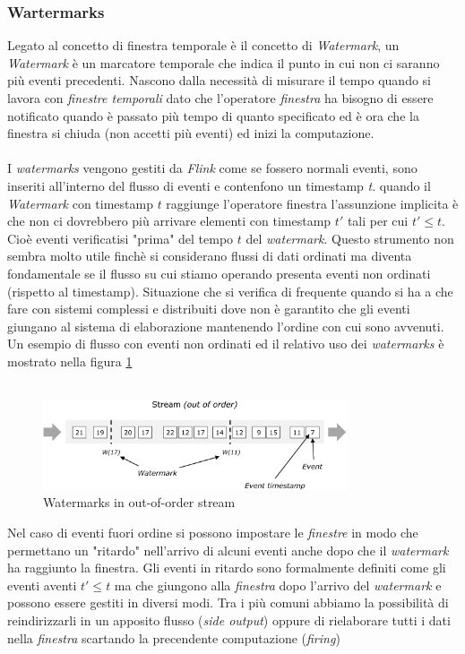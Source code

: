 \subsubsection{Wartermarks}
\label{subsubsec:flink_watermarks}
Legato al concetto di finestra temporale è il concetto di \textit{Watermark}, un \textit{Watermark} è un marcatore temporale che indica il punto in cui non ci saranno più eventi precedenti.
Nascono dalla necessità di misurare il tempo quando si lavora con \textit{finestre temporali} dato che l'operatore \textit{finestra} ha bisogno di essere notificato
quando è passato più tempo di quanto specificato ed è ora che la finestra si chiuda (non accetti più eventi) ed inizi la computazione.\\\\
I \textit{watermarks} vengono gestiti da \textit{Flink} come se fossero normali eventi, sono inseriti all'interno del flusso di eventi e contenfono un timestamp \textit{t}.
quando il \textit{Watermark} con timestamp $t$ raggiunge l'operatore finestra l'assunzione implicita è che non ci dovrebbero più arrivare elementi con timestamp $t'$ tali per cui $t' \leq t$.
Cioè eventi verificatisi "prima" del tempo $t$ del \textit{watermark}.
Questo strumento non sembra molto utile finchè si considerano flussi di dati ordinati ma diventa fondamentale se il flusso su cui stiamo operando presenta eventi
non ordinati (rispetto al timestamp).
Situazione che si verifica di frequente quando si ha a che fare con sistemi complessi e distribuiti dove non è garantito che gli eventi 
giungano al sistema di elaborazione mantenendo l'ordine con cui sono avvenuti.
Un esempio di flusso con eventi non ordinati ed il relativo uso dei \textit{watermarks} è mostrato nella figura \ref{fig:watermark}\\\\
\begin{figure}[htbp]
    \centering
    \includegraphics[width=0.8\textwidth]{images/flink/watermark_out_of_order.png}
    \caption{Watermarks in out-of-order stream}
    \label{fig:watermark}
\end{figure}
Nel caso di eventi fuori ordine si possono impostare le \textit{finestre} in modo che permettano un "ritardo" nell'arrivo di alcuni eventi anche dopo che il \textit{watermark} ha raggiunto la finestra.
Gli eventi in ritardo sono formalmente definiti come gli eventi aventi $t' \leq t$ ma che giungono alla \textit{finestra} dopo l'arrivo del \textit{watermark} e possono essere gestiti in diversi modi.
Tra i più comuni abbiamo la possibilità di reindirizzarli in un apposito flusso (\textit{side output}) oppure di rielaborare tutti i dati nella \textit{finestra} scartando la precendente computazione (\textit{firing})

